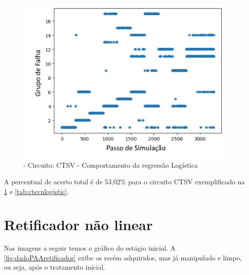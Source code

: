 \begin{itemize}
  \begin{figure}[H]
        \begin{center}
        \includegraphics[width=11cm]{./01_Pre_textuais/ctsv_figs/LogisticRegression_CTSV_mc_+_4bitPRBS_[FALHA]raw.png}
        \caption{\label{fig:LogisticRegressionClassifiectsv}- Circuito: CTSV - Comportamento da regressão Logística }
        \end{center}
        \end{figure}

A percentual de acerto total é de 53,02\% para o circuito CTSV exemplificado na \ref{fig:LogisticRegressionClassifiectsv} e \ref{tab:ctsvnlogistic}. 


\end{itemize} 


\section{\textbf{Retificador não linear}}


 Nas imagens a seguir temos o gráfico do estágio inicial. A  \ref{fig:dadoPAAretificador} exibe os recém adquiridos, mas já manipulado e limpo, ou seja, após o tratamento inicial. 
 
